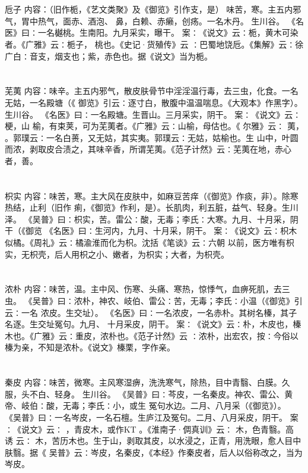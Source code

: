 \documentclass[12pt,UTF8]{ctexbook}
\begin{document}
\section{}卮子
内容：（旧作栀，《艺文类聚》及《御览》引作支，是） 
味苦，寒。主五内邪气，胃中热气，面赤、酒泡、 鼻，白赖、赤癞，创疡。一名木丹。 
生川谷。 
《名医》曰∶一名樾桃。生南阳。九月采实，曝干。 
案∶《说文》云∶栀，黄木可染者。《广雅》云∶栀子， 桃也。《史记·货殖传》云 
∶巴蜀地饶卮。《集解》云∶徐广白∶音支，烟支也；紫，赤色也。据《说文》当为栀。 


\section{}芜荑
内容：味辛。主五内邪气，散皮肤骨节中淫淫温行毒，去三虫，化食。一名无姑，一名殿塘（《 
御览》引云∶逐寸白，散腹中温温喘息。《大观本》作黑字）。生川谷。 
《名医》曰∶一名殿塘。生晋山。三月采实，阴干。 
案∶《说文》云∶梗，山 榆，有束荚，可为芜荑者。《广雅》云∶山榆，母估也。《 
尔雅》云∶ 荑， 。郭璞云∶一名白蒉，又无姑，其实夷。郭璞云∶无姑，姑榆也。生 
山中，叶圆而浓，剥取皮合渍之，其味辛香，所谓芜荑。《范子计然》云∶芜荑在地，赤心 
者，善。 


\section{}枳实
内容：味苦，寒。主大风在皮肤中，如麻豆苦痒（《御览》作痰，非）。除寒热结，止利（旧作 
痢，《御览》作利，是）。长肌肉，利五脏，益气、轻身。生川泽。 
《吴普》曰∶枳实，苦。雷公∶酸，无毒；李氏∶大寒。九月、十月采，阴干（《御览 
《名医》曰∶生河内，九月、十月采，阴干。 
案∶《说文》云∶枳木似橘。《周礼》云∶橘渝淮而化为枳。沈括《笔谈》云∶六朝 
以前，医方唯有枳实，无枳壳，后人用枳之小、嫩者，为枳实；大者，为枳壳。 


\section{}浓朴
内容：味苦，温。主中风、伤寒、头痛、寒热，惊悸气，血痹死肌，去三虫。 
《吴普》曰∶浓朴，神农、岐伯、雷公∶苦，无毒；李氏∶小温（《御览》引云∶一名 
浓皮。生交址）。 
《名医》曰∶一名浓皮，一名赤朴。其树名榛，其子名逐。生交址冤句。九月、 
十月采皮，阴干。 
案∶《说文》云∶朴，木皮也，榛木也。《广雅》云∶重皮，浓朴也。《范子计然》云 
∶浓朴，出宏农，按∶今俗以榛为亲，不知是浓朴。《说文》榛栗，字作亲。 


\section{}秦皮
内容：味苦，微寒。主风寒湿痹，洗洗寒气，除热，目中青翳、白膜。久服，头不白、轻身。 
生川谷。 
《吴普》曰∶芩皮，一名秦皮。神农、雷公、黄帝、岐伯∶酸，无毒；李氏∶小，或生 
冤句水边。二月、八月采（《御览》）。 
《吴普》曰∶一名岑皮，一名石檀。生庐江及冤句。二月、八月采皮，阴干。 
案∶《说文》云∶ ，青皮木，或作KT 。《淮南子·倜真训》云∶ 木，色青翳。高 
诱 
云∶ 木，苦历木也。生于山，剥取其皮，以水浸之，正青，用洗眼，愈人目中肤翳。据《 
吴普》云∶岑皮，名秦皮，《本经》作秦皮者，后人以俗称改之，当为岑皮。 
\end{document}
